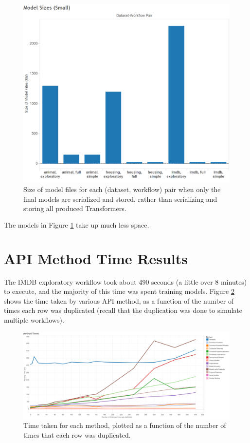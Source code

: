 \begin{figure}
  \centering
  \includegraphics[width=5.0in]{modelsizes_small}
  \caption{
    Size of model files for each (dataset, workflow) pair when only the final models are serialized
    and stored, rather than serializing and storing all produced Transformers.
  }
  \label{fig:modelsizes_small}
\end{figure}

The models in Figure \ref{fig:modelsizes_small} take up much less space.

\section{API Method Time Results}
The IMDB exploratory workflow took about 490 seconds (a little over 8 minutes)
to execute, and the majority of this time was spent training models. Figure \ref{fig:methodtimes}
shows the time taken by various API method, as a function of the number of times each row
was duplicated (recall that the duplication was done to simulate multiple workflows).

\begin{figure}
  \centering
  \includegraphics[width=6.0in]{methodtimes}
  \caption{
    Time taken for each method, plotted as a function of the number of times that
    each row was duplicated.
  }
  \label{fig:methodtimes}
\end{figure}

